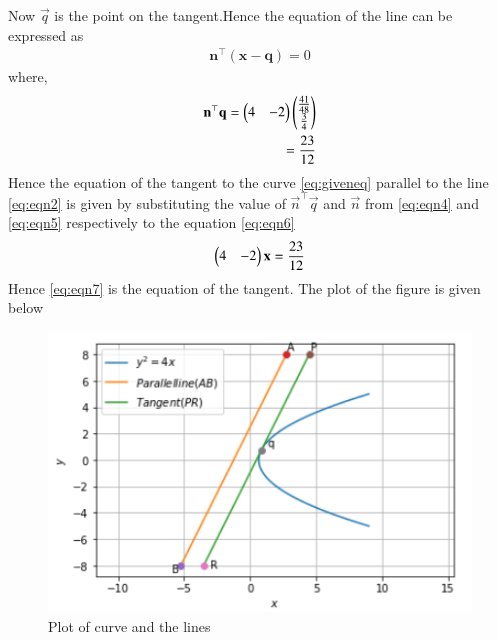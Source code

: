 \documentclass[journal,12pt,twocolumn]{IEEEtran}
\begin{document}
Now $\vec{q}$ is the point on the tangent.Hence the equation of the line can be expressed as 
\begin{align}
    \mathbf{n}^{\top}(\mathbf{x}-\mathbf{q}) = 0\label{eq:eqn6}
\end{align}
where,
\begin{align}
\mathbf{n}^{\top}\mathbf{q}
    =\begin{pmatrix}4&-2\end{pmatrix}\begin{pmatrix}\frac{41}{48} \\ \frac{3}{4}\end{pmatrix} 
    \\
    = \frac{23}{12} \label{eq:eqn4}
\end{align}
Hence the equation of the tangent to the curve \eqref{eq:giveneq} parallel to the line \eqref{eq:eqn2} is given by substituting the value of $\vec{n}^{\top}\vec{q}$ and $\vec{n}$ from \eqref{eq:eqn4} and \eqref{eq:eqn5} respectively to the equation \eqref{eq:eqn6} 
\begin{align}
    \begin{pmatrix}4&-2\end{pmatrix}\mathbf{x}=\frac{23}{12} \label{eq:eqn7}
\end{align}
Hence \eqref{eq:eqn7} is the equation of the tangent.
The plot of the figure is given below

\begin{figure}[ht]
\centering
\includegraphics[width=\columnwidth]{Parabola.PNG}
\caption{Plot of curve and the lines}
\label{Plot of curve and the lines}
\end{figure}
\end{document}
